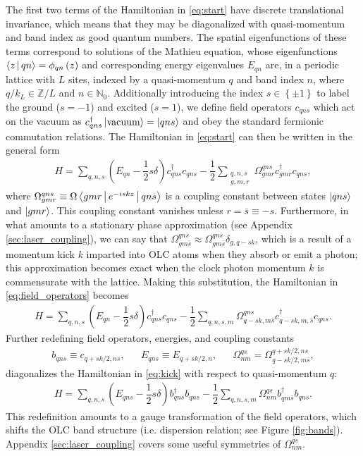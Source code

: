 \documentclass[aps,notitlepage,nofootinbib,11pt]{revtex4-1}
\renewcommand{\t}{\text} %
\newcommand{\f}[2]{\dfrac{#1}{#2}} %
\newcommand{\p}[1]{\left(#1\right)} %
\renewcommand{\set}[1]{\left\{#1\right\}} %
\newcommand{\bk}{\Braket} %
\newcommand{\1}{\mathds{1}}
\newcommand{\Z}{\mathbb Z}
\begin{document}
The first two terms of the Hamiltonian in \eqref{eq:start} have
discrete translational invariance, which means that they may be
diagonalized with quasi-momentum and band index as good quantum
numbers.  The spatial eigenfunctions of these terms correspond to
solutions of the Mathieu equation, whose eigenfunctions
$\bk{z|qn}=\phi_{qn}\p{z}$ and corresponding energy eigenvalues
$E_{qn}$ are, in a periodic lattice with $L$ sites, indexed by a
quasi-momentum $q$ and band index $n$, where $q/k_L\in\Z/L$ and
$n\in\mathbb N_0$.  Additionally introducing the index
$s\in\set{\pm 1}$ to label the ground ($s=-1$) and excited ($s=1$), we
define field operators $c_{qns}$ which act on the vacuum as
$c_{qns}^\dag\ket{\t{vacuum}}=\ket{qns}$ and obey the standard
fermionic commutation relations.  The Hamiltonian in \eqref{eq:start}
can then be written in the general form
\begin{align}
  H
  = \sum_{q,n,s}\p{E_{qn}-\f12s\delta}c_{qns}^\dag c_{qns}
  - \f12\sum_{\substack{q,n,s\\g,m,r}}
  \Omega^{qns}_{gmr} c_{gmr}^\dag c_{qns},
  \label{eq:field_operators}
\end{align}
where $\Omega^{qns}_{gmr}\equiv\Omega\bk{gmr|e^{-iskz}|qns}$ is a
coupling constant between states $\ket{qns}$ and $\ket{gmr}$.  This
coupling constant vanishes unless $r=\bar s\equiv-s$.  Furthermore, in
what amounts to a stationary phase approximation (see Appendix
\ref{sec:laser_coupling}), we can say that
$\Omega^{qns}_{gm\bar s} \approx \Omega^{qns}_{gm\bar s}
\delta_{g,q-sk}$, which is a result of a momentum kick $k$ imparted
into OLC atoms when they absorb or emit a photon; this approximation
becomes exact when the clock photon momentum $k$ is commensurate with
the lattice.  Making this substitution, the Hamiltonian in
\eqref{eq:field_operators} becomes
\begin{align}
  H
  = \sum_{q,n,s}\p{E_{qn}-\f12s\delta}c_{qns}^\dag c_{qns}
  - \f12\sum_{q,n,s,m}\Omega^{qns}_{q-sk,m\bar s}
  c_{q-sk,m,\bar s}^\dag c_{qns}.
  \label{eq:kick}
\end{align}
Further redefining field operators, energies, and coupling constants
\begin{align}
  b_{qns} \equiv c_{q+sk/2,ns},
  &&
  E_{qns} \equiv E_{q+sk/2,n},
  &&
  \Omega^{qs}_{nm} = \Omega^{q+sk/2,ns}_{q-sk/2,m\bar s},
  \label{eq:transformation}
\end{align}
diagonalizes the Hamiltonian in \eqref{eq:kick} with respect to
quasi-momentum $q$:
\begin{align}
  H
  = \sum_{q,n,s}\p{E_{qns}-\f12s\delta} b_{qns}^\dag b_{qns}
  - \f12\sum_{q,n,s,m} \Omega^{qs}_{nm} b_{qm\bar s}^\dag b_{qns}.
  \label{eq:full_H}
\end{align}
This redefinition amounts to a gauge transformation of the field
operators, which shifts the OLC band structure (i.e. dispersion
relation; see Figure \ref{fig:bands}).  Appendix
\ref{sec:laser_coupling} covers some useful symmetries of
$\Omega^{qs}_{nm}$.
\end{document}
